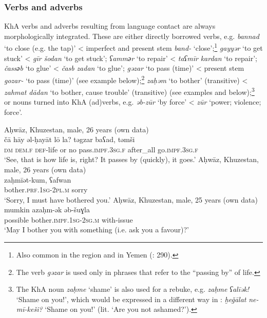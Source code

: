 \documentclass[output=paper,nonflat]{langsci/langscibook}
\begin{document}
\subsubsection{Verbs and adverbs} 

KhA verbs and adverbs resulting from language contact are always morphologically integrated. These are either directly borrowed  verbs, e.g. \textit{bannad} ‘to close (e.g. the tap)’ <  imperfect and present {stem} \textit{band-} ‘close’;\footnote{Also common in the  region and in {Yemen} (\citealt{BehnstedtWoidich2014}: 290).} \textit{gayyər} ‘to get stuck’ <   \textit{gīr} \textit{šodan} ‘to get stuck’; \textit{ʕamm{әr}} ‘to repair’ <  \textit{taʕmīr} \textit{kardan} ‘to repair’; \textit{čass{әb}} ‘to glue’ <  \textit{časb} \textit{zadan} ‘to glue’; \textit{gəzar} ‘to pass (time)’ <  present {stem} \textit{gozar-} ‘to pass (time)’ (see example  below);\footnote{The verb \textit{gəzar} is used only in phrases that refer to the “passing by” of life.} \textit{zaḥəm} ‘to bother’ (transitive) <  \textit{zahmat dādan} ‘to bother, cause trouble’ (transitive) (see examples  and  below);\footnote{The KhA noun \textit{zaḥme} `shame' is also used for a rebuke, e.g. \textit{zaḥme} \textit{ʕalīək!} ‘Shame on you!’, which would be expressed in a different way in : \textit{ḫeǧālat} \textit{ne-mī-keši?} ‘Shame on you!' (lit. ‘Are you not ashamed?’).} or  nouns turned into KhA (ad)verbs, e.g. \textit{əb-zūr} ‘by force’ <  \textit{zūr} ‘power; violence; force’.

\ea
{Aḥwāz, Khuzestan, male, 26 years (own data)}\\ \label{ca}
\gll čā hāy əl-ḥayāt lō la? təgzar baʕad, təmši\\
     \textsc{dm} \textsc{dem}.\textsc{f} \textsc{def}{}-life or no pass.\textsc{impf}.\textsc{3sg.f} after\_all go.\textsc{impf.3sg.f}\\
\glt ‘See, that is how life is, right? It passes by (quickly), it goes.’
\ex \label{zah}
{Aḥwāz, Khuzestan, male, 26 years (own data)}\\
\gll zaḥmīət-kum, ʕafwan\\
     bother.\textsc{prf}.\textsc{1sg}{}-\textsc{2pl.m} sorry\\
\glt ‘Sorry, I must have bothered you.’\footnotemark
\ex \label{mumkin}
{Aḥwāz, Khuzestan, male, 25 years (own data)}\\
\gll mumkin azaḥm-ək əb-šuɣla\\
     possible bother.\textsc{impf}.\textsc{1sg}{}-\textsc{2sg.m} with-issue\\
\glt ‘May I bother you with something (i.e. ask you a favour)?’
\z
{}
\end{document}
